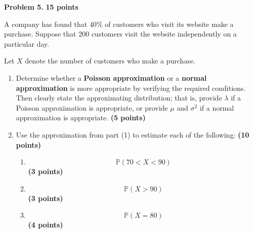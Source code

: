 \documentclass[11pt]{article}
\begin{document}
\newpage

\begin{problemheader}
\textbf{Problem 5.} \hfill \textbf{15 points}
\end{problemheader}

A company has found that \(40\%\) of customers who visit its website make a purchase. Suppose that \(200\) customers visit the website independently on a particular day.

Let \(X\) denote the number of customers who make a purchase.

\begin{enumerate}[label=\arabic*.,leftmargin=*,itemsep=1.2em]

\item Determine whether a \textbf{Poisson approximation} or a
\textbf{normal approximation} is more appropriate by verifying the
required conditions. Then clearly state the approximating distribution;
that is, provide \(\lambda\) if a Poisson approximation is appropriate,
or provide \(\mu\) and \(\sigma^2\) if a normal approximation is
appropriate.
\hfill \textbf{(5 points)}

\item Use the approximation from part (1) to estimate each of the following:
\hfill \textbf{(10 points)}

\begin{enumerate}[label=(\alph*),leftmargin=*,itemsep=0.7em]

    \item
    \[
    \mathbb{P}(70<X<90)
    \]
    \hfill \textbf{(3 points)}

    \item
    \[
    \mathbb{P}(X>90)
    \]
    \hfill \textbf{(3 points)}

    \item
    \[
    \mathbb{P}(X=80)
    \]
    \hfill \textbf{(4 points)}

\end{enumerate}

\end{enumerate}
\end{document}
